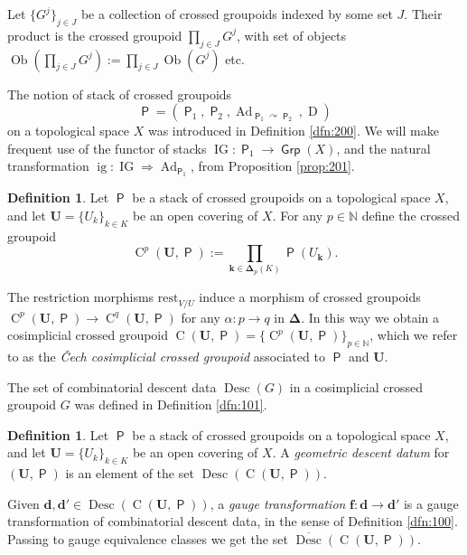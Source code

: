 \documentclass[a4paper, 10pt]{amsart}
\theoremstyle{definition}
\newtheorem{dfn}[equation]{Definition}
\numberwithin{equation}{section}
\newcommand{\opn}{\operatorname}
\newcommand{\cat}[1]{\operatorname{\mathsf{#1}}}
\newcommand{\ol}{\overline}
\newcommand{\mrm}[1]{\mathrm{#1}}
\newcommand{\mbb}[1]{\mathbb{#1}}
\newcommand{\bsym}[1]{\boldsymbol{#1}}
\newcommand{\N}{\mbb{N}}
\newcommand{\al}{\alpha}
\newcommand{\twoto}{\Rightarrow}
\newcommand{\twocat}[1]{\operatorname{\bsym{\cat{#1}}}}
\newcommand{\crvar}{\curvearrowright}
\begin{document}
Let $\{ G^j \}_{j \in J}$ be a collection of crossed groupoids
indexed by some set $J$.
Their product is the crossed groupoid  
$\prod_{j \in J} G^j$, with set of objects 
$\opn{Ob}(\prod_{j \in J} G^j) := 
\prod_{j \in J} \opn{Ob}(G^j)$
etc.

The notion of stack of crossed groupoids
\[ \twocat{P} = ( \twocat{P}_1, \twocat{P}_2, 
\opn{Ad}_{\twocat{P}_1 \crvar \twocat{P}_{2}}, \opn{D} ) \]
on a topological space $X$ was introduced in Definition \ref{dfn:200}.
We will make frequent use of the functor of stacks 
$\opn{IG} : \twocat{P}_1 \to \twocat{Grp}(X)$,
and the natural transformation
$\opn{ig} : \opn{IG} \twoto \opn{Ad}_{\twocat{P}_1}$,
from Proposition \ref{prop:201}.

\begin{dfn} \label{dfn:mdd.101}
Let $\twocat{P}$ be a stack of crossed groupoids on a
topological space $X$, and let $\bsym{U} = \{ U_k \}_{k \in K}$ be an
open covering of $X$. For any $p \in \N$ define the crossed groupoid 
\[ \opn{C}^p(\bsym{U}, \twocat{P}) := 
\prod_{\bsym{k} \in \bsym{\Delta}_p(K)} \twocat{P}(U_{\bsym{k}}) . \]

The restriction morphisms 
$\mrm{rest}^{}_{V / U}$ induce a morphism of crossed groupoids 
$\opn{C}^p(\bsym{U}, \twocat{P}) \to \opn{C}^q(\bsym{U}, \twocat{P})$
for any $\al : p \to q$ in $\bsym{\Delta}$. 
In this way we obtain a cosimplicial crossed groupoid 
$\opn{C}(\bsym{U}, \twocat{P}) = 
\{ \opn{C}^p(\bsym{U}, \twocat{P}) \}_{p \in \N}$,
which we refer to as the {\em \v{C}ech cosimplicial crossed groupoid}
associated to $\twocat{P}$ and $\bsym{U}$. 
\end{dfn}

The set of combinatorial descent data 
$\opn{Desc}(G)$ in a cosimplicial crossed groupoid $G$ 
was defined in Definition \ref{dfn:101}.

\begin{dfn} \label{dfn:21}
Let $\twocat{P}$ be a stack of crossed groupoids on a
topological space $X$, and let $\bsym{U} = \{ U_k \}_{k \in K}$ be an
open covering of $X$. A {\em geometric descent datum} for 
$(\bsym{U}, \twocat{P})$ is an element of the set 
$\opn{Desc}(\opn{C}(\bsym{U}, \twocat{P}))$.

Given $\bsym{d}, \bsym{d}' \in \opn{Desc}(\opn{C}(\bsym{U}, \twocat{P}))$,
a {\em gauge transformation} 
$\bsym{f} : \bsym{d} \to \bsym{d}'$ is a gauge transformation
of combinatorial descent data, in the sense of Definition \ref{dfn:100}.
Passing to gauge equivalence classes we get the set
$\ol{\opn{Desc}}(\opn{C}(\bsym{U}, \twocat{P}))$.
\end{dfn}
\end{document}
